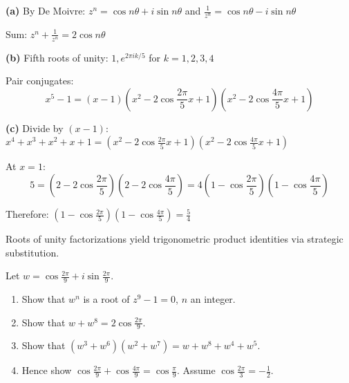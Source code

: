 \begin{solution}
\textbf{(a)} By De Moivre: $z^n = \cos n\theta + i\sin n\theta$ and $\frac{1}{z^n} = \cos n\theta - i\sin n\theta$

Sum: $z^n + \frac{1}{z^n} = 2\cos n\theta$

\textbf{(b)} Fifth roots of unity: $1, e^{2\pi ik/5}$ for $k=1,2,3,4$

Pair conjugates:
$$
x^5-1 = (x-1)\left(x^2 - 2\cos\frac{2\pi}{5}x + 1\right)\left(x^2 - 2\cos\frac{4\pi}{5}x + 1\right)
$$

\textbf{(c)} Divide by $(x-1)$: $x^4+x^3+x^2+x+1 = \left(x^2 - 2\cos\frac{2\pi}{5}x + 1\right)\left(x^2 - 2\cos\frac{4\pi}{5}x + 1\right)$

At $x=1$: 
$$
5 = \left(2 - 2\cos\frac{2\pi}{5}\right)\left(2 - 2\cos\frac{4\pi}{5}\right) = 4\left(1-\cos\frac{2\pi}{5}\right)\left(1-\cos\frac{4\pi}{5}\right)
$$

Therefore: $\left(1-\cos\frac{2\pi}{5}\right)\left(1-\cos\frac{4\pi}{5}\right) = \frac{5}{4}$

\end{solution}

\begin{takeaways}
Roots of unity factorizations yield trigonometric product identities via strategic substitution.
\end{takeaways}

\vspace{1cm}

\begin{problem}
Let $w = \cos\frac{2\pi}{9} + i \sin\frac{2\pi}{9}$.
\begin{enumerate}
    \item Show that $w^n$ is a root of $z^9 - 1 = 0$, $n$ an integer.
    \item Show that $w + w^8 = 2 \cos\frac{2\pi}{9}$.
    \item Show that $(w^3 + w^6)(w^2 + w^7) = w + w^8 + w^4 + w^5$.
    \item Hence show $\cos\frac{2\pi}{9} + \cos\frac{4\pi}{9} = \cos\frac{\pi}{9}$. Assume $\cos\frac{2\pi}{3} = -\frac{1}{2}$.
\end{enumerate}
\end{problem}

